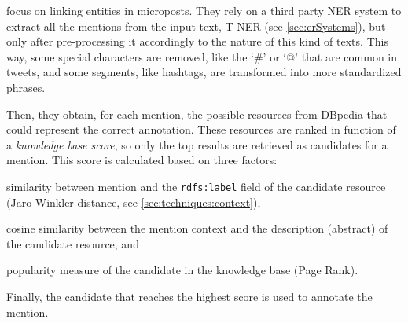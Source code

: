 \cite{caliano2016} focus on linking entities in microposts. They rely on a third party NER system to extract all the mentions from the input text, T-NER (see \autoref{sec:erSystems}), but only after pre-processing it accordingly to the nature of this kind of texts. This way, some special characters are removed, like the `\#' or `@' that are common in tweets, and some segments, like hashtags, are transformed into more standardized phrases. 

Then, they obtain, for each mention, the possible resources from DBpedia that could represent the correct annotation. These resources are ranked in function of a \emph{knowledge base score}, so only the top results are retrieved as candidates for a mention. This score is calculated based on three factors:
%
\begin{enumerate*}
\item similarity between mention and the \texttt{rdfs:label} field of the candidate resource (Jaro-Winkler distance, see \autoref{sec:techniques:context}),
\item cosine similarity between the mention context and the description (abstract) of the candidate resource, and
\item popularity measure of the candidate in the knowledge base (Page Rank).
\end{enumerate*} 
%
Finally, the candidate that reaches the highest score is used to annotate the mention.

